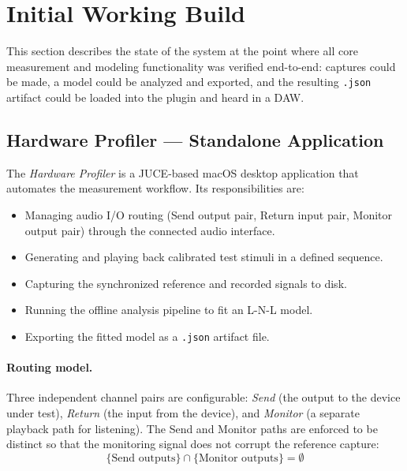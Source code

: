 \documentclass[11pt, letterpaper]{article}
\begin{document}
\section{Initial Working Build}
\label{sec:initial}

This section describes the state of the system at the point where all core
measurement and modeling functionality was verified end-to-end: captures could
be made, a model could be analyzed and exported, and the resulting
\texttt{.json} artifact could be loaded into the plugin and heard in a DAW.

\subsection{Hardware Profiler — Standalone Application}

The \emph{Hardware Profiler} is a JUCE-based macOS desktop application that
automates the measurement workflow.  Its responsibilities are:

\begin{itemize}[leftmargin=1.5em]
    \item Managing audio I/O routing (Send output pair, Return input pair,
          Monitor output pair) through the connected audio interface.
    \item Generating and playing back calibrated test stimuli in a defined
          sequence.
    \item Capturing the synchronized reference and recorded signals to disk.
    \item Running the offline analysis pipeline to fit an L-N-L model.
    \item Exporting the fitted model as a \texttt{.json} artifact file.
\end{itemize}

\paragraph{Routing model.}
Three independent channel pairs are configurable: \emph{Send} (the output to
the device under test), \emph{Return} (the input from the device), and
\emph{Monitor} (a separate playback path for listening).  The Send and Monitor
paths are enforced to be distinct so that the monitoring signal does not corrupt
the reference capture:
\begin{equation}
    \{\text{Send outputs}\} \cap \{\text{Monitor outputs}\} = \emptyset
\end{equation}
\end{document}
